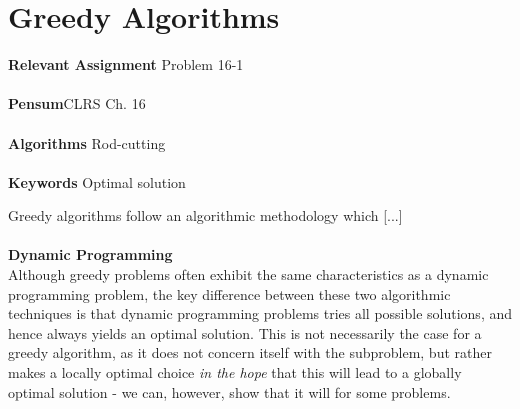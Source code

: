 
\chapter{Greedy Algorithms}
\label{ch:greedyalgorithms}

\textbf{Relevant Assignment} Problem 16-1 \\\\
\textbf{Pensum}CLRS Ch. 16\\\\
\textbf{Algorithms} Rod-cutting \\\\
\textbf{Keywords} Optimal solution
\vspace{1in}

\noindent Greedy algorithms follow an algorithmic methodology which [...] 
\\\\
\noindent \textbf{Dynamic Programming} \\
Although greedy problems often exhibit the same characteristics as a dynamic
programming problem, the key difference between these two algorithmic
techniques is that dynamic programming problems tries all possible solutions,
and hence always yields an optimal solution. This is not necessarily the case
for a greedy algorithm, as it does not concern itself with the subproblem, but
rather makes a locally optimal choice \textit{in the hope} that this will lead
to a globally optimal solution - we can, however, show that it will for some
problems.


